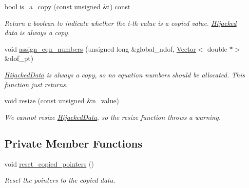 \begin{DoxyCompactItemize}
bool \hyperlink{classoomph_1_1HijackedData_acfd12ec29b7787c8796effbb8284892d}{is\+\_\+a\+\_\+copy} (const unsigned \&\hyperlink{cfortran_8h_adb50e893b86b3e55e751a42eab3cba82}{i}) const
\begin{DoxyCompactList}\small\item\em Return a boolean to indicate whether the i-\/th value is a copied value. \hyperlink{classoomph_1_1Hijacked}{Hijacked} data is always a copy. \end{DoxyCompactList}\item 
void \hyperlink{classoomph_1_1HijackedData_a960b9595a1d8049de58c76d3573d3a35}{assign\+\_\+eqn\+\_\+numbers} (unsigned long \&global\+\_\+ndof, \hyperlink{classoomph_1_1Vector}{Vector}$<$ double $\ast$$>$ \&dof\+\_\+pt)
\begin{DoxyCompactList}\small\item\em \hyperlink{classoomph_1_1HijackedData}{Hijacked\+Data} is always a copy, so no equation numbers should be allocated. This function just returns. \end{DoxyCompactList}\item 
void \hyperlink{classoomph_1_1HijackedData_ae2ae3e860b36b40c133d56aae5fc39a3}{resize} (const unsigned \&n\+\_\+value)
\begin{DoxyCompactList}\small\item\em We cannot resize \hyperlink{classoomph_1_1HijackedData}{Hijacked\+Data}, so the resize function throws a warning. \end{DoxyCompactList}\end{DoxyCompactItemize}
\subsection*{Private Member Functions}
\begin{DoxyCompactItemize}
\item 
void \hyperlink{classoomph_1_1HijackedData_ae8253ed64e04771ea3d45c3d84d614d7}{reset\+\_\+copied\+\_\+pointers} ()
\begin{DoxyCompactList}\small\item\em Reset the pointers to the copied data. \end{DoxyCompactList}\end{DoxyCompactItemize}
